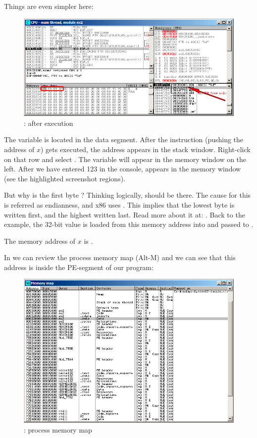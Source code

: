 \clearpage
{}
\myindex{\olly}

Things are even simpler here:

\begin{figure}[H]
\centering
\includegraphics[scale=\FigScale]{patterns/04_scanf/2_global/ex2_olly_1.png}
\caption{\olly: after \scanf execution}
\label{fig:scanf_ex2_olly_1}
\end{figure}

The variable is located in the data segment.
After the \PUSH instruction (pushing the address of $x$) gets executed, 
the address appears in the stack window. Right-click on that row and select .
The variable will appear in the memory window on the left.
After we have entered 123 in the console, 
 appears in the memory window (see the highlighted screenshot regions).

But why is the first byte ?
Thinking logically,  should be
there.
The cause for this is referred as  \gls{endianness}, and x86 uses .
This implies that the lowest byte is written first, and the highest written last.
Read more about it at: .
Back to the example, the 32-bit value is loaded from this memory address into \EAX and passed to \printf.

The memory address of $x$ is .

\clearpage
In \olly we can review the process memory map (Alt-M)
and we can see that this address is inside the  PE-segment of our program:

\begin{figure}[H]
\centering
\includegraphics[scale=\FigScale]{patterns/04_scanf/2_global/ex2_olly_2.png}
\caption{\olly: process memory map}
\label{fig:scanf_ex2_olly_2}
\end{figure}

